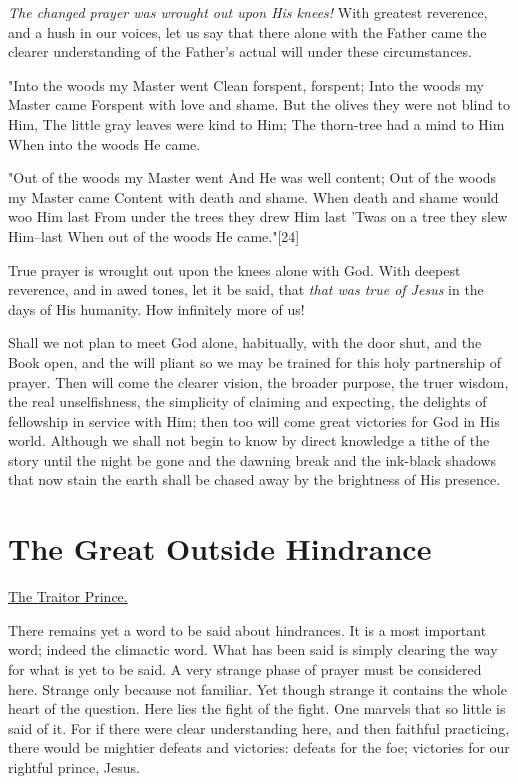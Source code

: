 \textit{The changed prayer was wrought out upon His knees!} With greatest
reverence, and a hush in our voices, let us say that there alone with the
Father came the clearer understanding of the Father's actual will under
these circumstances.

    "Into the woods my Master went
    Clean forspent, forspent;
    Into the woods my Master came
    Forspent with love and shame.
    But the olives they were not blind to Him,
    The little gray leaves were kind to Him;
    The thorn-tree had a mind to Him
    When into the woods He came.

    "Out of the woods my Master went
    And He was well content;
    Out of the woods my Master came
    Content with death and shame.
    When death and shame would woo Him last
    From under the trees they drew Him last
    'Twas on a tree they slew Him--last
    When out of the woods He came."[24]

True prayer is wrought out upon the knees alone with God. With deepest
reverence, and in awed tones, let it be said, that \textit{that was true of
Jesus} in the days of His humanity. How infinitely more of us!

Shall we not plan to meet God alone, habitually, with the door shut, and
the Book open, and the will pliant so we may be trained for this holy
partnership of prayer. Then will come the clearer vision, the broader
purpose, the truer wisdom, the real unselfishness, the simplicity of
claiming and expecting, the delights of fellowship in service with Him;
then too will come great victories for God in His world. Although we
shall not begin to know by direct knowledge a tithe of the story until the
night be gone and the dawning break and the ink-black shadows that now
stain the earth shall be chased away by the brightness of His presence.




\chapter{The Great Outside Hindrance}



\underline{The Traitor Prince.}


There remains yet a word to be said about hindrances. It is a most
important word; indeed the climactic word. What has been said is simply
clearing the way for what is yet to be said. A very strange phase of
prayer must be considered here. Strange only because not familiar. Yet
though strange it contains the whole heart of the question. Here lies the
fight of the fight. One marvels that so little is said of it. For if there
were clear understanding here, and then faithful practicing, there would
be mightier defeats and victories: defeats for the foe; victories for our
rightful prince, Jesus.


